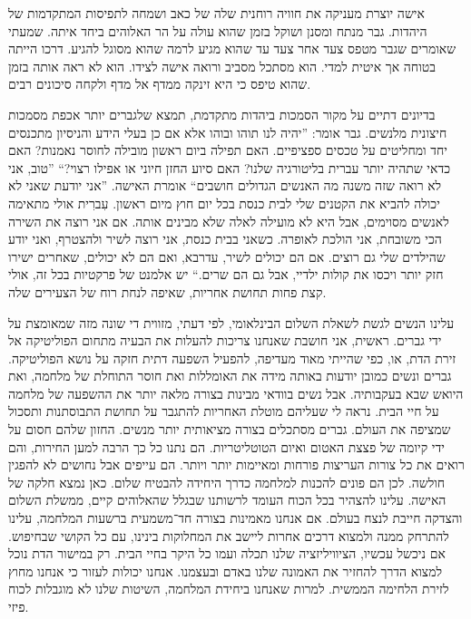 \documentclass[14pt, article, extrafontsizes, twopage, a4paper]{memoir}
\begin{document}
אישה יוצרת מעניקה את חוויה רוחנית שלה של
כאב ושמחה לתפיסות המתקדמות של היהדות. 
גבר מנתח ומסנן ושוקל בזמן שהוא
עולה על הר האלוהים ביחד איתה. שמעתי שאומרים שגבר
מטפס צעד אחר צעד עד שהוא מגיע לרמה שהוא מסוגל
להגיע. דרכו הייתה בטוחה אך איטית למדי. הוא מסתכל
מסביב ורואה אישה לצידו. הוא לא ראה אותה
בזמן שהוא טיפס כי היא זינקה ממדף אל
מדף ולקחה סיכונים רבים.

בדיונים דתיים על מקור הסמכות
ביהדות מתקדמת, תמצא שלגברים יותר אכפת
מסמכות חיצונית מלנשים. גבר אומר: ”יהיה לנו
תוהו ובוהו אלא אם כן בעלי הידע והניסיון מתכנסים
יחד ומחליטים על טכסים ספציפיים. האם תפילה ביום ראשון
מובילה לחוסר נאמנות? האם כדאי שתהיה יותר עברית
בליטורגיה שלנו? האם סיוע החזן חיוני או
אפילו רצוי?“ ”טוב, אני לא רואה שזה משנה מה
האנשים הגדולים חושבים“ אומרת האישה. ”אני יודעת שאני לא יכולה להביא
את הקטנים שלי לבית כנסת בכל יום חוץ מיום ראשון. עִברִית
אולי מתאימה לאנשים מסוימים, אבל היא לא מועילה
לאלה שלא מבינים אותה. אם אני רוצה את השירה הכי משובחת,
אני הולכת לאופרה. כשאני בבית כנסת, אני רוצה
לשיר ולהצטרף, ואני יודע שהילדים שלי גם רוצים. אם הם
יכולים לשיר, עדרבא, ואם הם לא יכולים, שאחרים
ישירו חזק יותר ויכסו את קולות ילדיי, אבל גם הם
שרים.“ יש אלמנט של פרקטיות בכל
זה, אולי קצת פחות תחושת אחריות, שאיפה
לנחת רוח של הצעירים שלה.

עלינו הנשים לגשת לשאלת השלום הבינלאומי,
לפי דעתי, מזווית די שונה מזה
שמאומצת על ידי גברים. ראשית, אני חושבת שאנחנו צריכות להעלות
את הבעיה מתחום הפוליטיקה אל זירת
הדת, או, כפי שהייתי מאוד מעדיפה, להפעיל
השפעה דתית חזקה על נושא הפוליטיקה. גברים
ונשים כמובן יודעות באותה מידה את האומללות ואת
חוסר התוחלת של מלחמה, ואת היואש שבא בעקבותיה.
אבל נשים בוודאי מבינות בצורה מלאה יותר את ההשפעה
של מלחמה על חיי הבית. נראה לי שעליהם מוטלת האחריות
להתגבר על תחושת התבוסתנות ותסכול
שמציפה את העולם. גברים מסתכלים בצורה
מציאותית יותר מנשים. החזון שלהם
חסום על ידי קיומה של פצצת האטום ואיום
הטוטליטריות. הם נתנו כל כך הרבה למען
החירות, והם רואים את כל צורות העריצות פורחות
ומאיימות יותר ויותר. הם עייפים אבל
נחושים לא להפגין חולשה. לכן הם פונים להכנות למלחמה
כדרך היחידה להבטיח שלום. כאן נמצא
חלקה של האישה. עלינו להצהיר בכל הכוח
העומד לרשותנו שבגלל שהאלוהים קיים, ממשלת השלום
והצדקה חייבת לנצח בעולם. אם אנחנו מאמינות בצורה חד־משמעית
ברשעות המלחמה, עלינו להתרחק ממנה
ולמצוא דרכים אחרות ליישב את המחלוקות בינינו,
עם כל הקושי שבחיפוש. אם ניכשל עכשיו, הציוויליזציה שלנו
תכלה ועמו כל היקר בחיי הבית.
רק במישור הדת נוכל למצוא
הדרך להחזיר את האמונה שלנו באדם ובעצמנו. אנחנו
יכולות לעזור כי אנחנו מחוץ לזירת הלחימה הממשית.
למרות שאנחנו ביחידת המלחמה, השיטות שלנו לא
מוגבלות לכוח פיזי.
\end{document}
